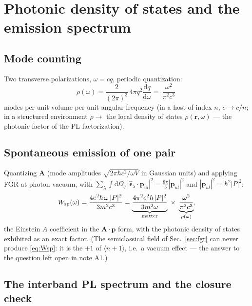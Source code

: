\documentclass[11pt,a4paper]{article}
\numberwithin{equation}{section}
\newcommand{\dd}{\mathrm{d}}
\begin{document}
\section{Photonic density of states and the emission spectrum}
\label{sec:photonic}

\subsection{Mode counting}

Two transverse polarizations, $\omega=cq$, periodic quantization:
\begin{equation}
\rho(\omega)=\frac{2}{(2\pi)^3}\,4\pi q^2\frac{\dd q}{\dd\omega}
=\boxed{\ \frac{\omega^2}{\pi^2c^3}\ }
\label{eq:rho}
\end{equation}
modes per unit volume per unit angular frequency (in a host of index
$n$, $c\to c/n$; in a structured environment $\rho\to$ the local
density of states $\rho(\mathbf r,\omega)$ --- the photonic factor of
the PL factorization).

\subsection{Spontaneous emission of one pair}

Quantizing $\mathbf A$ (mode amplitudes $\sqrt{2\pi\hbar c^2/\omega V}$
in Gaussian units) and applying FGR at photon vacuum, with
$\sum_\lambda\int\dd\Omega_q\,
|\hat{\bm\epsilon}_\lambda\!\cdot\!\mathbf p_{ul}|^2
=\tfrac{8\pi}{3}|\mathbf p_{ul}|^2$ and
$|\mathbf p_{ul}|^2=\hbar^2|P|^2$:
\begin{equation}
W_{\rm sp}(\omega)
=\frac{4e^2\hbar\,\omega\,|P|^2}{3m^2c^3}
=\underbrace{\frac{4\pi^2 e^2\hbar\,|P|^2}{3m^2\omega}}_{\text{matter}}
\;\times\;
\underbrace{\frac{\omega^2}{\pi^2c^3}}_{\rho(\omega)} ,
\label{eq:Wsp}
\end{equation}
the Einstein $A$ coefficient in the $\mathbf A\!\cdot\!\mathbf p$
form, with the photonic density of states exhibited as an exact
factor.  (The semiclassical field of Sec.~\ref{sec:fgr} can never
produce \eqref{eq:Wsp}: it is the $+1$ of $\langle n+1\rangle$,
i.e.\ a vacuum effect --- the answer to the question left open in
note A1.)

\subsection{The interband PL spectrum and the closure check}
\end{document}
